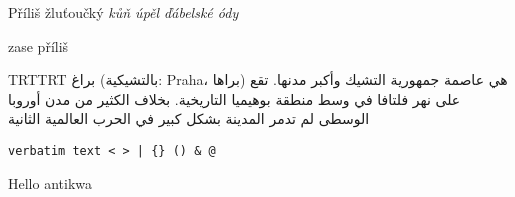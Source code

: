 \documentclass{article}
\newenvironment{arab}{\pardir TRT\textdir TRT\amiri}{}
\begin{document}
Příliš žluťoučký \textit{kůň úpěl ďábelské ódy}

\pokus zase příliš

\begin{arab}
براغ (بالتشيكية: Praha، براها) هي عاصمة جمهورية التشيك وأكبر مدنها. تقع على نهر فلتافا في وسط منطقة بوهيميا التاريخية. بخلاف الكثير من مدن أوروبا الوسطى لم تدمر المدينة بشكل كبير في الحرب العالمية الثانية 
\end{arab}

\begin{verbatim}
verbatim text < > | {} () & @
\end{verbatim}

\apcregular Hello antikwa
\end{document}
